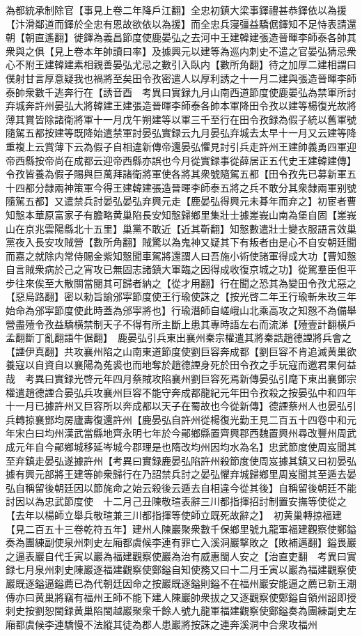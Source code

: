 為都統承制除官【事見上卷二年降戶江翻】全忠初鎮大梁事鐸禮甚恭鐸依以為援【汴滑鄰道而鐸於全忠有恩故欲依以為援】而全忠兵寖彊益驕倨鐸知不足恃表請還朝【朝直遙翻】徙鐸為義昌節度使鹿晏弘之去河中王建韓建張造晉暉李師泰各帥其衆與之俱【見上卷本年帥讀曰率】及據興元以建等為巡内刺史不遣之官晏弘猜忌衆心不附王建韓建素相親善晏弘尤忌之數引入臥内【數所角翻】待之加厚二建相謂曰僕射甘言厚意疑我也禍將至矣田令孜密遣人以厚利誘之十一月二建與張造晉暉李師泰帥衆數千逃奔行在【誘音酉　考異曰實録九月山南西道節度使鹿晏弘為禁軍所討弃城奔許州晏弘大將韓建王建張造晉暉李師泰各帥本軍降田令孜以建等楊復光故將薄其賞皆除諸衛將軍十一月戊午朔建等以軍三千至行在田令孜録為假子統以舊軍號隨駕五都按建等既降始遣禁軍討晏弘實録云九月晏弘弃城去太早十一月又云建等降重複上云賞薄下云為假子自相違新傳帝還晏弘懼見討引兵走許州王建帥義勇四軍迎帝西縣按帝尚在成都云迎帝西縣亦誤也今月從實録事從薛居正五代史王建韓建傳】令孜皆養為假子賜與巨萬拜諸衛將軍使各將其衆號隨駕五都【田令孜先已募新軍五十四都分隸兩神策軍今得王建韓建張造晉暉李師泰五將之兵不敢分其衆隸兩軍别號隨駕五都】又遣禁兵討晏弘晏弘弃興元走【鹿晏弘得興元未朞年而弃之】初宦者曹知慤本華原富家子有膽略黄巢陷長安知慤歸鄉里集壯士據嵳峩山南為堡自固【嵳峩山在京兆雲陽縣北十五里】巢黨不敢近【近其靳翻】知慤數遣壯士變衣服語言效巢黨夜入長安攻賊營【數所角翻】賊驚以為鬼神又疑其下有叛者由是心不自安朝廷聞而嘉之就除内常侍賜金紫知慤聞車駕將還謂人曰吾施小術使諸軍得成大功【曹知慤自言賊衆病於己之宵攻已無固志諸鎮大軍臨之因得成收復京城之功】從駕羣臣但平步往來俟至大散關當閱其可歸者納之【從才用翻】行在聞之恐其為變田令孜尤惡之【惡烏路翻】密以勑旨諭邠寜節度使王行瑜使誅之【按光啓二年王行瑜斬朱玫三年始命為邠寜節度使此時蓋為邠寜將也】行瑜潛師自嵯峨山北乘高攻之知慤不為備舉營盡殪令孜益驕横禁制天子不得有所主斷上患其專時語左右而流涕【殪壹計翻横戶孟翻斷丁亂翻語牛倨翻】　鹿晏弘引兵東出襄州秦宗權遣其將秦誥趙德諲將兵會之【諲伊真翻】共攻襄州陷之山南東道節度使劉巨容奔成都【劉巨容不肯追滅黄巢欲養寇以自資自以襄陽為菟裘也而地奪於趙德諲身死於田令孜之手玩寇而邀君果何益哉　考異曰實録光啓元年四月蔡賊攻陷襄州劉巨容死焉新傳晏弘引麾下東出襄鄧宗權遣趙德諲合晏弘兵攻襄州巨容不能守奔成都龍紀元年田令孜殺之按晏弘中和四年十一月已據許州又巨容所以奔成都以天子在蜀故也今從新傳】德諲蔡州人也晏弘引兵轉掠襄鄧均房廬夀復還許州【鹿晏弘自許州從楊復光勤王見二百五十四卷中和元年宋白曰均州漢武當縣地齊永明七年於今鄖鄉縣置齊興郡西魏置興州尋改豐州周武成元年自今鄖鄉城移延岑城今郡理是也隋改均州因均水為名】忠武節度使周岌聞其至弃鎮走晏弘遂據許州【考異曰實録鹿晏弘陷許州殺節度使周岌據其鎮又曰初晏弘據有興元部將王建等帥衆歸行在乃詔禁兵討之晏弘懼弃城歸鄉里周岌聞其至遁去晏弘自稱留後朝廷因以節旄命之始云殺後云遁去自相違今從其後】自稱留後朝廷不能討因以為忠武節度使　十二月己丑陳敬瑄表辭三川都指揮招討制置安撫等使從之【去年以楊師立舉兵敬瑄兼三川都指揮等使師立既死故辭之】　初黄巢轉掠福建【見二百五十三卷乾符五年】建州人陳巖聚衆數千保鄉里號九龍軍福建觀察使鄭鎰奏為團練副使泉州刺史左廂都虞候李連有罪亡入溪洞巖撃敗之【敗補邁翻】鎰畏巖之逼表巖自代壬寅以巖為福建觀察使巖為治有威惠閩人安之【治直吏翻　考異曰實録七月泉州刺史陳巖逐福建觀察使鄭鎰自知使務又曰十二月壬寅以巖為福建觀察使巖既逐鎰逼鎰薦已為代朝廷因命之按巖既逐鎰則鎰不在福州巖安能逼之薦已新王潮傳亦曰黄巢將竊有福州王師不能下建人陳巖帥衆拔之又逐觀察使鄭鎰自領州詔即授刺史按劉恕閩録黄巢陷閩越巖聚衆千餘人號九龍軍福建觀察使鄭鎰奏為團練副史左廂都虞候李連驕慢不法縱其徒為郡人患巖將按誅之連奔溪洞中合衆攻福州